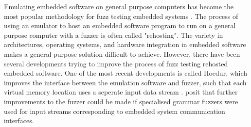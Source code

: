 \documentclass[../report.tex]{subfiles}
\begin{document}
Emulating embedded software on general purpose computers has become the most
popular methodology for fuzz testing embedded systems \citep{Yun_2022}. The
process of using an emulator to host an embedded software program to run on a
general purpose computer with a fuzzer is often called "rehosting". The variety
in architectures, operating systems, and hardware integration in embedded
software makes a general purpose solution difficult to achieve. However, there
have been several developments trying to improve the process of fuzz testing
rehosted embedded software. One of the most recent developments is called
Hoedur, which improves the interface between the emulation software and fuzzer,
such that each virtual memory location uses a seperate input data stream
\citep{Hoedur_2023}. \citet{Hoedur_2023} posit that further improvements to the
fuzzer could be made if specialised grammar fuzzers were used for input streams
corresponding to embedded system communication interfaces.
\end{document}
